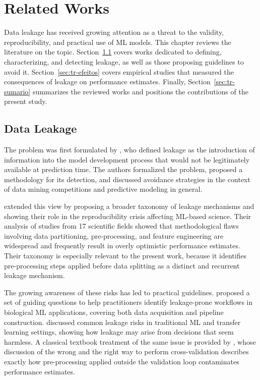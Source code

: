 \chapter{Related Works}
\label{cap:trabalhos}

Data leakage has received growing attention as a threat to the validity,
reproducibility, and practical use of ML models. This chapter reviews the
literature on the topic. Section~\ref{sec:tr-dl} covers works
dedicated to defining, characterizing, and detecting leakage, as well as those
proposing guidelines to avoid it. Section~\ref{sec:tr-efeitos} covers empirical
studies that measured the consequences of leakage on performance estimates.
Finally, Section~\ref{sec:tr-sumario} summarizes the reviewed works and positions
the contributions of the present study.

\section{Data Leakage}
\label{sec:tr-dl}

The problem was first formulated by , who defined leakage as the introduction of information into the model development
process that would not be legitimately available at prediction time. The authors
formalized the problem, proposed a methodology for its detection, and discussed
avoidance strategies in the context of data mining competitions and predictive
modeling in general.

 extended this view by proposing a broader taxonomy of
leakage mechanisms and showing their role in the
reproducibility crisis affecting ML-based science. Their analysis of studies from
17 scientific fields showed that methodological flaws involving data
partitioning, pre-processing, and feature engineering are widespread and
frequently result in overly optimistic performance estimates. Their taxonomy is
especially relevant to the present work, because it identifies
pre-processing steps applied before data splitting as a distinct and recurrent
leakage mechanism.

The growing awareness of these risks has led to practical guidelines.  proposed a set of guiding
questions to help practitioners identify leakage-prone workflows in biological ML
applications, covering both data acquisition and pipeline construction.
 discussed common leakage risks in traditional ML and
transfer learning settings, showing how leakage may arise from decisions that
seem harmless. A classical textbook treatment of the same
issue is provided by , whose discussion of the wrong and
the right way to perform cross-validation describes exactly how
pre-processing applied outside the validation loop contaminates performance
estimates.

